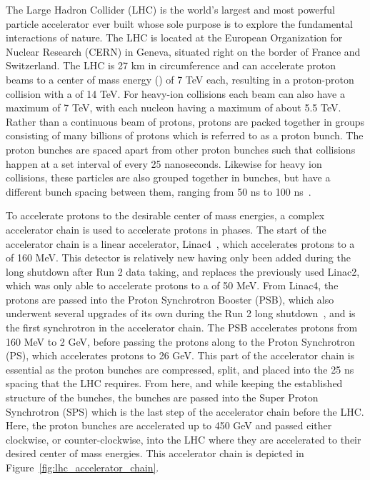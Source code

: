 The Large Hadron Collider (LHC) is the world's largest and most powerful particle accelerator ever built whose sole purpose is to explore the fundamental interactions of nature. The LHC is located at the European Organization for Nuclear Research (CERN) in Geneva, situated right on the border of France and Switzerland.
The LHC is 27 km in circumference and can accelerate proton beams to a center of mass energy (\com{}) of 7 TeV each, resulting in a proton-proton collision with a \com{} of 14 TeV. For heavy-ion collisions each beam can also have a maximum \com{} of 7 TeV, with each nucleon having a maximum \com{} of about 5.5 TeV. Rather than a continuous beam of protons, protons are packed together in groups consisting of many billions of protons which is referred to as a proton bunch. The proton bunches are spaced apart from other proton bunches such that collisions happen at a set interval of every 25 nanoseconds. 
Likewise for heavy ion collisions, these particles are also grouped together in bunches, but have a different bunch spacing between them, ranging from 50 ns to 100 ns~\cite{Alice_first_pb_2023}. %

To accelerate protons to the desirable center of mass energies, a complex accelerator chain is used to accelerate protons in phases. The start of the accelerator chain is a linear accelerator, Linac4~\cite{linac4_yellow_report}, which accelerates protons to a \com{} of 160 MeV. This detector is relatively new having only been added during the long shutdown after Run 2 data taking, and replaces the previously used Linac2, which was only able to accelerate protons to a \com{} of 50 MeV. From Linac4, the protons are passed into the Proton Synchrotron Booster (PSB), which also underwent several upgrades of its own during the Run 2 long shutdown~\cite{psb_ls2_upgrade}, and is the first synchrotron in the accelerator chain. 
The PSB accelerates protons from 160 MeV to 2 GeV, before passing the protons along to the Proton Synchrotron (PS), which accelerates protons to 26 GeV. This part of the accelerator chain is essential as the proton bunches are compressed, split, and placed into the 25 ns spacing that the LHC requires. From here, and while keeping the established structure of the bunches, the bunches are passed into the Super Proton Synchrotron (SPS) which is the last step of the accelerator chain before the LHC\@. Here, the proton bunches are accelerated up to 450 GeV and passed either clockwise, or counter-clockwise, into the LHC where they are accelerated to their desired center of mass energies. This accelerator chain is depicted in Figure~\ref{fig:lhc_accelerator_chain}.

